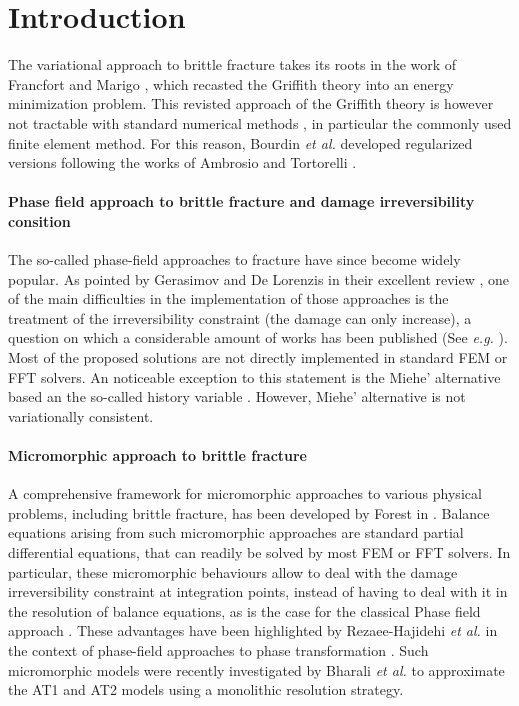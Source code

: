 \section{Introduction}

The variational approach to brittle fracture takes its roots in the work of
Francfort and Marigo \cite{francfort_revisiting_1998,francfort_vers_2002},
which recasted the Griffith theory into an energy
minimization problem.
This revisted approach of the Griffith theory is however not tractable
with standard numerical methods
\cite{bourdin_numerical_2000, chambolle_approximation_2018}, in particular
the commonly used finite element method. For this reason, Bourdin \textit{et
al.} developed regularized versions \cite{bourdin_numerical_2000} following
the works of Ambrosio and Tortorelli \cite{ambrosio_approximation_1990}.

\paragraph{Phase field approach to brittle fracture and damage irreversibility consition}

The so-called phase-field approaches to fracture have since become
widely popular. As pointed by Gerasimov and De Lorenzis in their
excellent review \cite{gerasimov_numerical_2020}, one of the main
difficulties in the implementation of those approaches is the treatment
of the irreversibility constraint (the damage can only increase), a
question on which a considerable amount of works has been published
(See \textit{e.g.}
\cite{Bourdin2014, Laurenzis2020, DelPietroLancioniMarch2020, Chambolle2018, Gerasimov2019, Bourdin2008}).
Most of the proposed solutions are not directly implemented in standard
FEM or FFT solvers. An noticeable exception to this statement is the
Miehe' alternative based an the so-called history variable
\cite{miehe_phase_2010}. However, Miehe' alternative is not variationally
consistent.

\paragraph{Micromorphic approach to brittle fracture}

A comprehensive framework for 
micromorphic approaches to various physical problems,
including brittle fracture, has been developed by Forest in
\cite{forest_micromorphic_2009, forest_nonlinear_2016}.
Balance equations arising from
such micromorphic approaches are
standard partial differential equations, that can readily be solved by
most FEM or FFT solvers.
In particular, these micromorphic behaviours allow to
deal with the damage irreversibility constraint at integration points,
instead of having to deal with it in the resolution of balance equations,
as is the case for the classical Phase field approach \cite{gerasimov_numerical_2020}. These
advantages have been highlighted by Rezaee-Hajidehi \textit{et al.} in the
context of phase-field approaches to phase transformation
\cite{rezaee-hajidehi_micromorphic_2021}.
%
%
%
Such micromorphic models were recently investigated by Bharali \textit{et al.}
\cite{bharali_computational_2021} to approximate the AT1 and AT2 models
using a monolithic resolution strategy.


